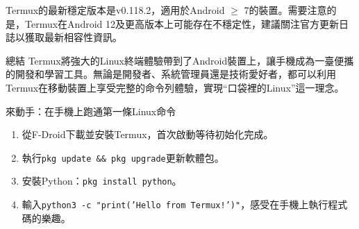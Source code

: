 
Termux的最新穩定版本是v0.118.2，適用於Android $\geq$ 7的裝置。需要注意的是，Termux在Android 12及更高版本上可能存在不穩定性，建議關注官方更新日誌以獲取最新相容性資訊。

\begin{tcbinfo}{總結}
Termux將強大的Linux終端體驗帶到了Android裝置上，讓手機成為一臺便攜的開發和學習工具。無論是開發者、系統管理員還是技術愛好者，都可以利用Termux在移動裝置上享受完整的命令列體驗，實現“口袋裡的Linux”這一理念。

\end{tcbinfo}

\begin{tcbpractice}{來動手：在手機上跑通第一條Linux命令}
\begin{enumerate}
  \item 從F-Droid下載並安裝Termux，首次啟動等待初始化完成。
  \item 執行\texttt{pkg update \&\& pkg upgrade}更新軟體包。
  \item 安裝Python：\texttt{pkg install python}。
  \item 輸入\texttt{python3 -\allowbreak c "print('Hello from Termux!')"}，感受在手機上執行程式碼的樂趣。
\end{enumerate}

\end{tcbpractice}
